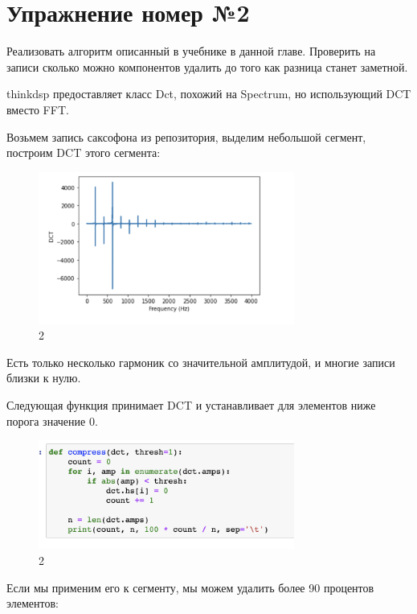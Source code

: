 \documentclass[10pt,a4paper,oneside]{article}
\begin{document}
\section{Упражнение номер №2}

Реализовать алгоритм описанный в учебнике в данной главе. Проверить на записи сколько можно компонентов удалить до того как разница станет заметной. 

thinkdsp предоставляет класс Dct, похожий на Spectrum, но использующий DCT вместо FFT.

Возьмем запись саксофона из репозитория, выделим небольшой сегмент, построим DCT этого сегмента:

\begin{figure}[H]
        \centering
        \includegraphics[width=0.75\textwidth]{pics/7.png}
        \caption{2}
        \label{fig:first}
\end{figure}

Есть только несколько гармоник со значительной амплитудой, и многие записи близки к нулю.

Следующая функция принимает DCT и устанавливает для элементов ниже порога значение 0.

\begin{figure}[H]
        \centering
        \includegraphics[width=0.75\textwidth]{pics/8.png}
        \caption{2}
        \label{fig:first}
\end{figure}

Если мы применим его к сегменту, мы можем удалить более 90 процентов элементов:
\end{document}
